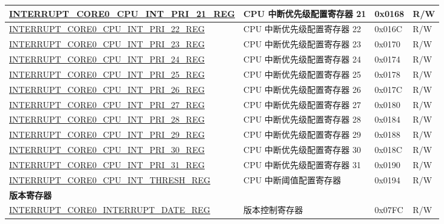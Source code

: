 \begin{longtable}{ | p{10cm} | m{10cm} | m{1.3cm} | m{1.0cm} | }
\hyperref[regdesc:INTERRUPTCORE0CPUINTPRI0REG]{INTERRUPT\_CORE0\_CPU\_INT\_PRI\_21\_REG} & CPU 中断优先级配置寄存器 21 & 0x0168 & R/W \\ \hline
\hyperref[regdesc:INTERRUPTCORE0CPUINTPRI0REG]{INTERRUPT\_CORE0\_CPU\_INT\_PRI\_22\_REG} & CPU 中断优先级配置寄存器 22 & 0x016C & R/W \\ \hline
\hyperref[regdesc:INTERRUPTCORE0CPUINTPRI0REG]{INTERRUPT\_CORE0\_CPU\_INT\_PRI\_23\_REG} & CPU 中断优先级配置寄存器 23 & 0x0170 & R/W \\ \hline
\hyperref[regdesc:INTERRUPTCORE0CPUINTPRI0REG]{INTERRUPT\_CORE0\_CPU\_INT\_PRI\_24\_REG} & CPU 中断优先级配置寄存器 24 & 0x0174 & R/W \\ \hline
\hyperref[regdesc:INTERRUPTCORE0CPUINTPRI0REG]{INTERRUPT\_CORE0\_CPU\_INT\_PRI\_25\_REG} & CPU 中断优先级配置寄存器 25 & 0x0178 & R/W \\ \hline
\hyperref[regdesc:INTERRUPTCORE0CPUINTPRI0REG]{INTERRUPT\_CORE0\_CPU\_INT\_PRI\_26\_REG} & CPU 中断优先级配置寄存器 26 & 0x017C & R/W \\ \hline
\hyperref[regdesc:INTERRUPTCORE0CPUINTPRI0REG]{INTERRUPT\_CORE0\_CPU\_INT\_PRI\_27\_REG} & CPU 中断优先级配置寄存器 27 & 0x0180 & R/W \\ \hline
\hyperref[regdesc:INTERRUPTCORE0CPUINTPRI0REG]{INTERRUPT\_CORE0\_CPU\_INT\_PRI\_28\_REG} & CPU 中断优先级配置寄存器 28 & 0x0184 & R/W \\ \hline
\hyperref[regdesc:INTERRUPTCORE0CPUINTPRI0REG]{INTERRUPT\_CORE0\_CPU\_INT\_PRI\_29\_REG} & CPU 中断优先级配置寄存器 29 & 0x0188 & R/W \\ \hline
\hyperref[regdesc:INTERRUPTCORE0CPUINTPRI0REG]{INTERRUPT\_CORE0\_CPU\_INT\_PRI\_30\_REG} & CPU 中断优先级配置寄存器 30 & 0x018C & R/W \\ \hline
\hyperref[regdesc:INTERRUPTCORE0CPUINTPRI0REG]{INTERRUPT\_CORE0\_CPU\_INT\_PRI\_31\_REG} & CPU 中断优先级配置寄存器 31 & 0x0190 & R/W \\ \hline
\hyperref[regdesc:INTERRUPTCORE0CPUINTTHRESHREG]{INTERRUPT\_CORE0\_CPU\_INT\_THRESH\_REG} & CPU 中断阈值配置寄存器 & 0x0194 & R/W \\ \hline
\multicolumn{4}{|l|}{\textbf{版本寄存器}} \\ \hline
\hyperref[regdesc:INTERRUPTCORE0INTERRUPTDATEREG]{INTERRUPT\_CORE0\_INTERRUPT\_DATE\_REG} & 版本控制寄存器 & 0x07FC & R/W \\ \hline
\end{longtable}
